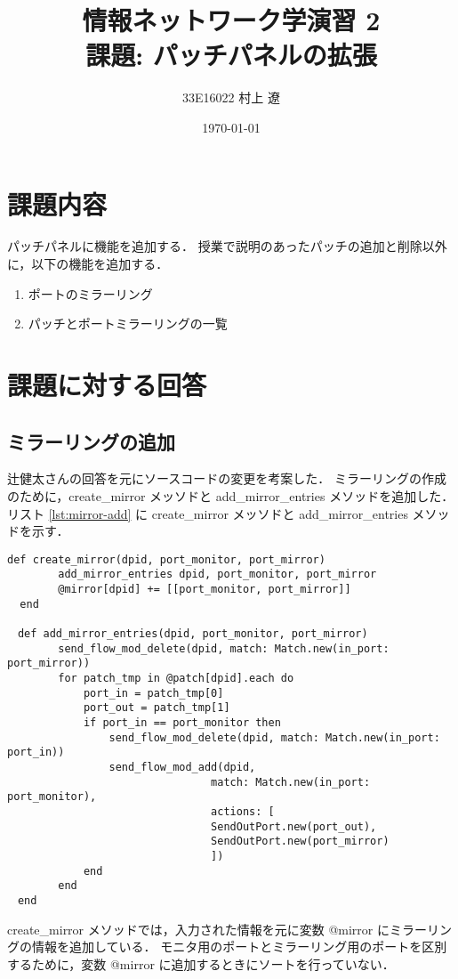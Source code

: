 ﻿\documentclass[10pt,a4paper,onecolumn]{jarticle}
\title{情報ネットワーク学演習 2\\ 課題: パッチパネルの拡張}
\author{33E16022 村上 遼}
\date{\today}
\begin{document}
\maketitle

\section{課題内容}

パッチパネルに機能を追加する．
授業で説明のあったパッチの追加と削除以外に，以下の機能を追加する．

\begin{enumerate}
	\item ポートのミラーリング
	\item パッチとポートミラーリングの一覧
\end{enumerate}


\section{課題に対する回答}


\subsection{ミラーリングの追加}

辻健太さんの回答を元にソースコードの変更を考案した．
ミラーリングの作成のために，create\_mirror メッソドと add\_mirror\_entries メソッドを追加した．
リスト \ref{lst:mirror-add} に create\_mirror メッソドと add\_mirror\_entries メソッドを示す．

\begin{lstlisting}[caption = ミラーリング作成用のメソッド, label = lst:mirror-add]
  def create_mirror(dpid, port_monitor, port_mirror)
		add_mirror_entries dpid, port_monitor, port_mirror
		@mirror[dpid] += [[port_monitor, port_mirror]]
  end

　def add_mirror_entries(dpid, port_monitor, port_mirror)
		send_flow_mod_delete(dpid, match: Match.new(in_port: port_mirror))
		for patch_tmp in @patch[dpid].each do
			port_in = patch_tmp[0]
			port_out = patch_tmp[1]
			if port_in == port_monitor then
				send_flow_mod_delete(dpid, match: Match.new(in_port: port_in))
				send_flow_mod_add(dpid, 
								match: Match.new(in_port: port_monitor),
								actions: [
								SendOutPort.new(port_out),
								SendOutPort.new(port_mirror)
								])
			end		
		end
　end
\end{lstlisting}

create\_mirror メソッドでは，入力された情報を元に変数 @mirror にミラーリングの情報を追加している．
モニタ用のポートとミラーリング用のポートを区別するために，変数 @mirror に追加するときにソートを行っていない．
\end{document}
